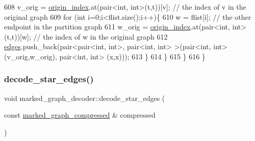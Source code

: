 \begin{DoxyCode}
608       v\_orig = \hyperlink{classmarked__graph__decoder_aab3e2f6d4376ba96da32f25aa9ddd069}{origin\_index}.at(pair<int, int>(t,t))[v]; \textcolor{comment}{// the index of v in the original graph
       }
609       \textcolor{keywordflow}{for} (\textcolor{keywordtype}{int} i=0;i<flist.size();i++)\{
610         w = flist[i]; \textcolor{comment}{// the other endpoint in the partition graph}
611         w\_orig = \hyperlink{classmarked__graph__decoder_aab3e2f6d4376ba96da32f25aa9ddd069}{origin\_index}.at(pair<int, int>(t,t))[w]; \textcolor{comment}{// the index of w in the original
       graph}
612         \hyperlink{classmarked__graph__decoder_af9e75da0a495d9c3bdcd169e15e3261e}{edges}.push\_back(pair<pair<int, int>, pair<int, int> >(pair<int, int>(v\_orig,w\_orig), pair<int,
       int> (x,x)));
613       \}
614     \}
615   \}
616 \}
\end{DoxyCode}
\mbox{\label{classmarked__graph__decoder_a79fcfb8d5616c691114ebc0a7adb18b2}} 
\subsubsection{\texorpdfstring{decode\+\_\+star\+\_\+edges()}{decode\_star\_edges()}}
{\footnotesize\ttfamily void marked\+\_\+graph\+\_\+decoder\+::decode\+\_\+star\+\_\+edges (\begin{DoxyParamCaption}\item[{const \hyperlink{classmarked__graph__compressed}{marked\+\_\+graph\+\_\+compressed} \&}]{compressed }\end{DoxyParamCaption})\hspace{0.3cm}{\ttfamily [private]}}



